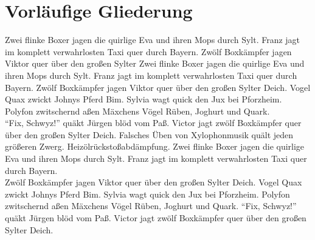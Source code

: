 \section{Vorläufige Gliederung}
Zwei flinke Boxer jagen die quirlige Eva und ihren Mops durch Sylt. Franz jagt im komplett verwahrlosten Taxi quer durch Bayern. Zwölf Boxkämpfer jagen Viktor quer über den großen Sylter Zwei flinke Boxer jagen die quirlige Eva und ihren Mops durch Sylt. Franz jagt im komplett verwahrlosten Taxi quer durch Bayern. Zwölf Boxkämpfer jagen Viktor quer über den großen Sylter Deich. Vogel Quax zwickt Johnys Pferd Bim. Sylvia wagt quick den Jux bei Pforzheim. Polyfon zwitschernd aßen Mäxchens Vögel Rüben, Joghurt und Quark.\\
"`Fix, Schwyz!"' quäkt Jürgen blöd vom Paß. Victor jagt zwölf Boxkämpfer quer über den großen Sylter Deich. Falsches Üben von Xylophonmusik quält jeden größeren Zwerg. Heizölrückstoßabdämpfung. Zwei flinke Boxer jagen die quirlige Eva und ihren Mops durch Sylt. Franz jagt im komplett verwahrlosten Taxi quer durch Bayern.\\
Zwölf Boxkämpfer jagen Viktor quer über den großen Sylter Deich. Vogel Quax zwickt Johnys Pferd Bim. Sylvia wagt quick den Jux bei Pforzheim. Polyfon zwitschernd aßen Mäxchens Vögel Rüben, Joghurt und Quark. "`Fix, Schwyz!"' quäkt Jürgen blöd vom Paß. Victor jagt zwölf Boxkämpfer quer über den großen Sylter Deich.\\

\newpage